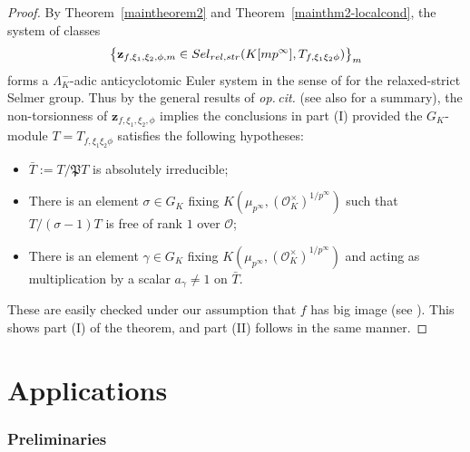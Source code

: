 \documentclass[10pt,letterpaper]{amsart}
\theoremstyle{plain}
\theoremstyle{definition}
\theoremstyle{definition}
\theoremstyle{plain}
\theoremstyle{plain}
\theoremstyle{plain}
\theoremstyle{remark}
\numberwithin{equation}{section}
\newcommand{\Sel}{Sel}
\newcommand{\pp}{\mathfrak{p}}
\newcommand{\ppbar}{\bar{\mathfrak{p}}}
\newcommand{\relstr}{{{\rm rel},{\rm str}}}
\def\cO{\mathcal O}
\newcommand{\Q}{\mathbf{Q}}
\def\Sel{{\rm Sel}}
\begin{document}
\begin{proof}
By Theorem~\ref{maintheorem2} and Theorem~\ref{mainthm2-localcond}, the system of classes
\begin{equation}\label{eq:ES-Lambda}
\bigl\{\mathbf{z}_{f,\xi_1,\xi_2,\phi,m}\in\Sel_{\relstr}(K[mp^\infty],T_{f,\xi_1\xi_2\phi})\bigr\}_m
\end{equation}
forms a $\Lambda_K^-$-adic anticyclotomic Euler system in the sense of \cite{JNS} for the relaxed-strict Selmer group. Thus by the general results of \emph{op.\,cit.} (see also \cite[\S{8.1}]{ACR} for a summary), the non-torsionness of $\mathbf{z}_{f,\xi_1,\xi_2,\phi}$ implies the conclusions in part (I) provided the $G_K$-module $T=T_{f,\xi_1\xi_2\phi}$ satisfies the following hypotheses:
\begin{itemize}
    \item[(i)] $\bar{T}:=T/\mathfrak{P}T$ is absolutely irreducible;
    \item[(ii)] There is an element $\sigma\in G_K$ fixing $K(\mu_{p^\infty},(\cO_K^\times)^{1/p^\infty})$ such that $T/(\sigma-1)T$ is free of rank $1$ over $\cO$;
    \item[(iii)] There is an element $\gamma\in G_K$ fixing $K(\mu_{p^\infty},(\cO_K^\times)^{1/p^\infty})$ and acting as multiplication by a scalar $a_\gamma\neq 1$ on $\bar{T}$.
\end{itemize}
These are easily checked under our assumption that $f$ has big image  (see \cite[Prop.~7.1.6]{LLZ-K}). This shows part (I) of the theorem, and part (II) follows in the same manner.
\end{proof}


\newpage
\part{Applications}
\label{part:App}

\section{Preliminaries}\label{sec:prelim-2}

\end{document}
